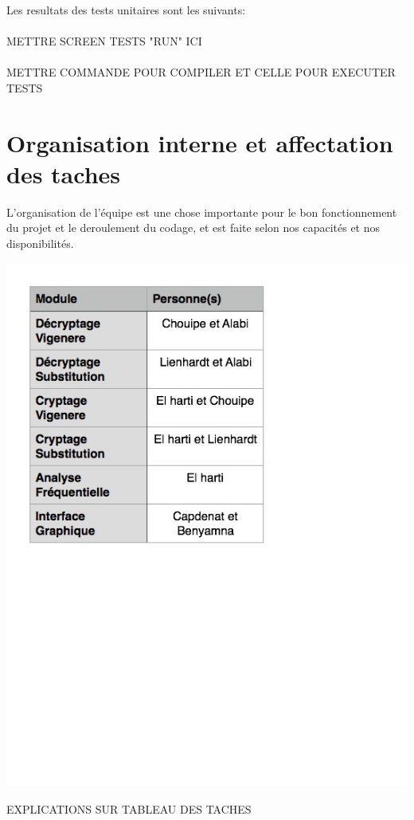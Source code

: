 \documentclass[a4]{article}
\begin{document}
  
Les resultats des tests unitaires sont les suivants:\\ \\ 
METTRE SCREEN TESTS "RUN" ICI \\ \\

		METTRE COMMANDE POUR COMPILER ET CELLE POUR EXECUTER TESTS
	\section{Organisation interne et affectation des taches}
	L'organisation de l'équipe est une chose importante pour le bon fonctionnement du
projet et le deroulement du codage, et est faite selon nos capacités et nos disponibilités.  \\ 
		 \begin{center}\includegraphics[scale=0.5]{tableau_tache_final.jpg}\end{center}
		 EXPLICATIONS SUR TABLEAU DES TACHES \\ 
		
\end{document}
